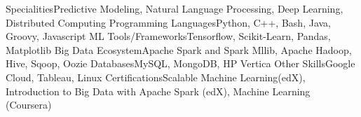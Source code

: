 \begin{cvskills}
\cvskill
{Specialities}{Predictive Modeling, Natural Language Processing, Deep Learning, Distributed Computing}
\cvskill
{Programming Languages}{Python, C++, Bash, Java, Groovy, Javascript}
\cvskill
{ML Tools/Frameworks}{Tensorflow, Scikit-Learn, Pandas, Matplotlib}
\cvskill
{Big Data Ecosystem}{Apache Spark and Spark Mllib, Apache Hadoop, Hive, Sqoop, Oozie}
\cvskill
{Databases}{MySQL, MongoDB, HP Vertica}
\cvskill
{Other Skills}{Google Cloud, Tableau, Linux}
\cvskill
{Certifications}{Scalable Machine Learning(edX), Introduction to Big Data with Apache Spark (edX), Machine Learning (Coursera)}
\end{cvskills}
